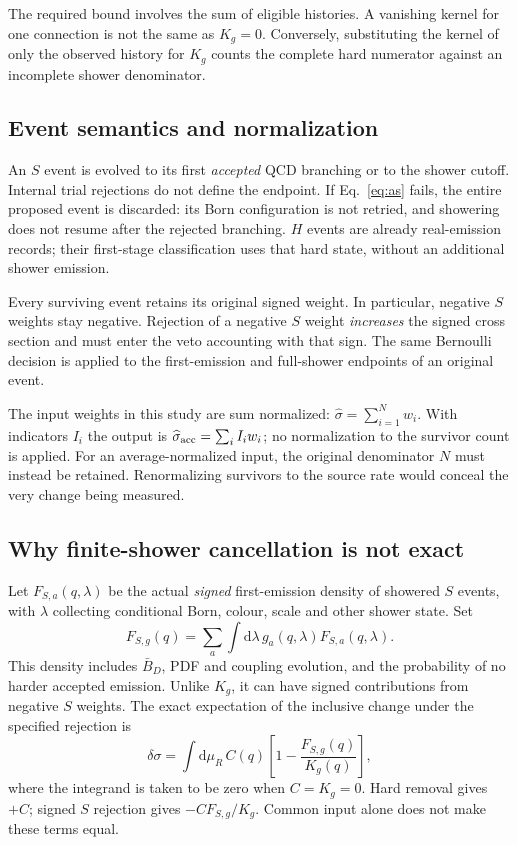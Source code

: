 \documentclass[11pt,a4paper]{article}
\newcommand{\dd}{\mathrm{d}}
\begin{document}
The required bound involves the sum of eligible histories. A vanishing
kernel for one connection is not the same as $K_g=0$. Conversely,
substituting the kernel of only the observed history for $K_g$ counts
the complete hard numerator against an incomplete shower denominator.

\subsection{Event semantics and normalization}
An $S$ event is evolved to its first \emph{accepted} QCD branching or to
the shower cutoff. Internal trial rejections do not define the endpoint.
If Eq.~\eqref{eq:as} fails, the entire proposed event is discarded: its
Born configuration is not retried, and showering does not resume after
the rejected branching. $H$ events are already real-emission records;
their first-stage classification uses that hard state, without an
additional shower emission.

Every surviving event retains its original signed weight. In particular,
negative $S$ weights stay negative. Rejection of a negative $S$ weight
\emph{increases} the signed cross section and must enter the veto
accounting with that sign. The same Bernoulli decision is applied to the
first-emission and full-shower endpoints of an original event.

The input weights in this study are sum normalized:
$\widehat\sigma=\sum_{i=1}^{N}w_i$. With indicators $I_i$ the output is
$\widehat\sigma_{\rm acc}=\sum_i I_iw_i$; no normalization to the survivor
count is applied. For an average-normalized input, the original
denominator $N$ must instead be retained. Renormalizing survivors to
the source rate would conceal the very change being measured.

\subsection{Why finite-shower cancellation is not exact}
\label{sec:finite}
Let $F_{S,a}(q,\lambda)$ be the actual \emph{signed} first-emission
density of showered $S$ events, with $\lambda$ collecting conditional
Born, colour, scale and other shower state. Set
\begin{equation}
 F_{S,g}(q)=\sum_a\int\dd\lambda\,g_a(q,\lambda)
                         F_{S,a}(q,\lambda).
 \label{eq:fs}
\end{equation}
This density includes $\bar B_D$, PDF and coupling evolution, and the
probability of no harder accepted emission. Unlike $K_g$, it can have
signed contributions from negative $S$ weights. The exact expectation
of the inclusive change under the specified rejection is
\begin{equation}
 \delta\sigma=\int\dd\mu_R\,C(q)
               \left[1-\frac{F_{S,g}(q)}{K_g(q)}\right],
 \label{eq:exactdifference}
\end{equation}
where the integrand is taken to be zero when $C=K_g=0$.
Hard removal gives $+C$; signed $S$ rejection gives
$-CF_{S,g}/K_g$. Common input alone does not make these terms equal.
\end{document}
